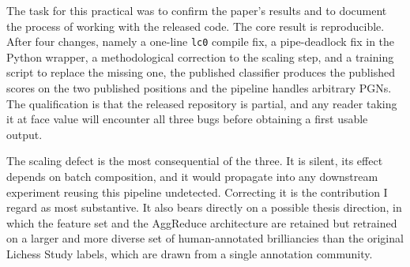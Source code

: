 \documentclass[11pt,a4paper]{article}
\begin{document}
The task for this practical was to confirm the paper's results and to
document the process of working with the released code. The core
result is reproducible. After four changes, namely a one-line
\texttt{lc0} compile fix, a pipe-deadlock fix in the Python wrapper, a
methodological correction to the scaling step, and a training script to
replace the missing one, the published classifier produces the
published scores on the two published positions and the pipeline
handles arbitrary PGNs. The qualification is that the released
repository is partial, and any reader taking it at face value will
encounter all three bugs before obtaining a first usable output.

The scaling defect is the most consequential of the three. It is
silent, its effect depends on batch composition, and it would
propagate into any downstream experiment reusing this pipeline
undetected. Correcting it is the contribution I regard as most
substantive. It also bears directly on a possible thesis direction, in
which the feature set and the AggReduce architecture are retained but
retrained on a larger and more diverse set of human-annotated
brilliancies than the original Lichess Study labels, which are drawn
from a single annotation community.
\end{document}
